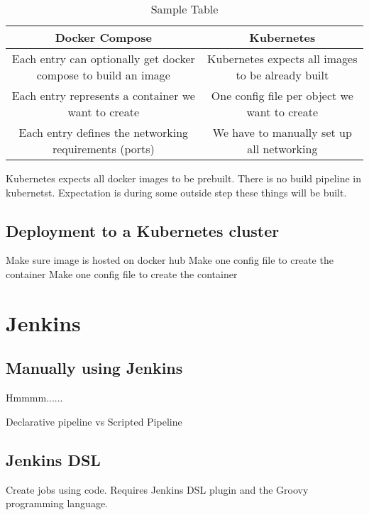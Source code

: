 \documentclass[a4paper, 11pt]{book}
\begin{document}
    \begin{table}[h]
        \centering
        \begin{tabular}{|c|c |}
            \hline
            Docker Compose                                                 & Kubernetes                                        \\
            \hline
            Each entry can optionally get docker compose to build an image & Kubernetes expects all images to be already built \\
            Each entry represents a container we want to create            & One config file per object we want to create      \\
            Each entry defines the networking requirements (ports)         & We have to manually set up all networking         \\
            \hline
        \end{tabular}
        \caption{Sample Table}
        \label{tab:sample}
    \end{table}

    Kubernetes expects all docker images to be prebuilt. There is no build pipeline in kubernetst.
    Expectation is during some outside step these things will be built.

    \subsection{Deployment to a Kubernetes cluster}
    Make sure image is hosted on docker hub
    Make one config file to create the container
    Make one config file to create the container



    \section{Jenkins}

    \subsection{Manually using Jenkins}
    Hmmmm......

    Declarative pipeline vs Scripted Pipeline

    \subsection{Jenkins DSL}
    Create jobs using code.
    Requires Jenkins DSL plugin and the Groovy programming language.
\end{document}
